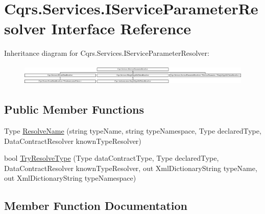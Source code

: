 \hypertarget{interfaceCqrs_1_1Services_1_1IServiceParameterResolver}{}\section{Cqrs.\+Services.\+I\+Service\+Parameter\+Resolver Interface Reference}
\label{interfaceCqrs_1_1Services_1_1IServiceParameterResolver}
Inheritance diagram for Cqrs.\+Services.\+I\+Service\+Parameter\+Resolver\+:\begin{figure}[H]
\begin{center}
\leavevmode
\includegraphics[height=0.989399cm]{interfaceCqrs_1_1Services_1_1IServiceParameterResolver}
\end{center}
\end{figure}
\subsection*{Public Member Functions}
\begin{DoxyCompactItemize}
\item 
Type \hyperlink{interfaceCqrs_1_1Services_1_1IServiceParameterResolver_a37c4b53616192e4e2f15ab4661ab99ae}{Resolve\+Name} (string type\+Name, string type\+Namespace, Type declared\+Type, Data\+Contract\+Resolver known\+Type\+Resolver)
\item 
bool \hyperlink{interfaceCqrs_1_1Services_1_1IServiceParameterResolver_a31c82a00b192b877faff6df99e1b689b}{Try\+Resolve\+Type} (Type data\+Contract\+Type, Type declared\+Type, Data\+Contract\+Resolver known\+Type\+Resolver, out Xml\+Dictionary\+String type\+Name, out Xml\+Dictionary\+String type\+Namespace)
\end{DoxyCompactItemize}


\subsection{Member Function Documentation}
\mbox{\label{interfaceCqrs_1_1Services_1_1IServiceParameterResolver_a37c4b53616192e4e2f15ab4661ab99ae}} 
